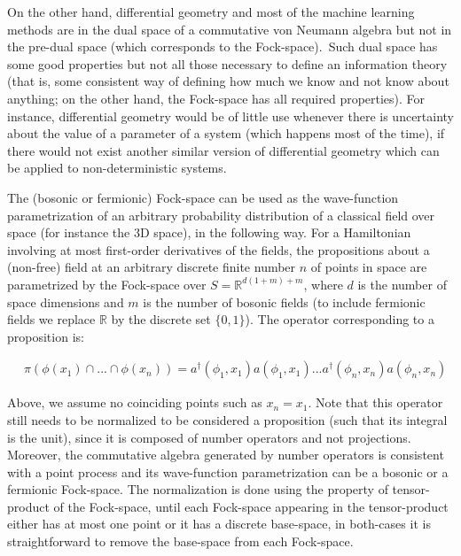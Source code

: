 \documentclass[11pt]{book}
\begin{document}
On the other hand, differential geometry and most of the machine
learning methods are in the dual space of a commutative von Neumann
algebra but not in the pre-dual space (which corresponds to the
Fock-space).~Such dual space has some good properties but not all those
necessary to define an information theory (that is, some consistent way
of defining how much we know and not know about anything; on the other
hand, the Fock-space has all required properties). For instance,
differential geometry would be of little use whenever there is
uncertainty about the value of a parameter of a system (which happens
most of the time), if there would not exist another similar version of
differential geometry which can be applied to non-deterministic systems.

The (bosonic or fermionic) Fock-space can be used as the wave-function
parametrization of an arbitrary probability distribution of a classical
field over space (for instance the 3D space), in the following way. For
a Hamiltonian involving at most first-order derivatives of the fields,
the propositions about a (non-free) field at an arbitrary discrete
finite number \(n\) of points in space are parametrized by the
Fock-space over \(S=\mathbb{R}^{d(1+m)+m}\), where \(d\) is the number
of space dimensions and \(m\) is the number of bosonic fields (to
include fermionic fields we replace \(\mathbb{R}\) by the discrete set
\(\{0,1\}\)). The operator corresponding to a proposition is:

\begin{equation}\begin{aligned}
    &\pi(\phi(x_1)\cap ...\cap \phi(x_n))=a^\dagger(\phi_1,x_1)a(\phi_1,x_1)...a^\dagger(\phi_n,x_n)a(\phi_n,x_n)\end{aligned}\end{equation}

Above, we assume no coinciding points such as \(x_n=x_1\). Note that
this operator still needs to be normalized to be considered a
proposition (such that its integral is the unit), since it is composed
of number operators and not projections. Moreover, the commutative
algebra generated by number operators is consistent with a point process
and its wave-function parametrization can be a bosonic or a fermionic
Fock-space. The normalization is done using the property of
tensor-product of the Fock-space, until each Fock-space appearing in the
tensor-product either has at most one point or it has a discrete
base-space, in both-cases it is straightforward to remove the base-space
from each Fock-space.
\end{document}
